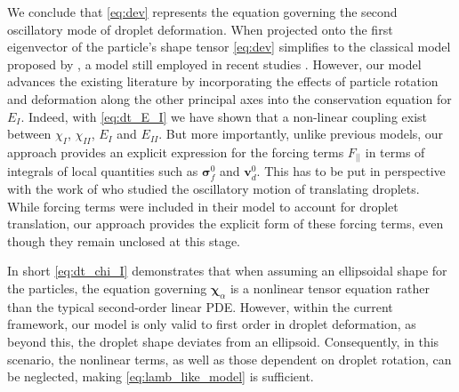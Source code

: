 We conclude that \ref{eq:dev} represents the equation governing the second oscillatory mode of droplet deformation. 
When projected onto the first eigenvector of the particle's shape tensor \ref{eq:dev} simplifies to the classical model proposed by \citet{lamb1924hydrodynamics}, a model still employed in recent studies \citep{riviere2021sub}. 
However, our model advances the existing literature by incorporating the effects of particle rotation and deformation along the other principal axes into the conservation equation for $E_I$. 
Indeed, with \ref{eq:dt_E_I} we have shown that a non-linear coupling exist between $\chi_I$, $\chi_{II}$, $E_I$ and $E_{II}$. 
But more importantly, unlike previous models, our approach provides an explicit expression for the forcing terms $F_{||}$ in terms of integrals of local quantities such as $\bm\sigma_f^0$ and $\textbf{v}_d^0$.
This has to be put in perspective with the work of \citet{lalanne2013effect} who studied the oscillatory motion of translating droplets. 
While forcing terms were included in their model to account for droplet translation, our approach provides the explicit form of these forcing terms, even though they remain unclosed at this stage.

In short \ref{eq:dt_chi_I} demonstrates that when assuming an ellipsoidal shape for the particles, the equation governing $\bm\chi_\alpha$ is a nonlinear tensor equation rather than the typical second-order linear PDE. 
However, within the current framework, our model is only valid to first order in droplet deformation, as beyond this, the droplet shape deviates from an ellipsoid. 
Consequently, in this scenario, the nonlinear terms, as well as those dependent on droplet rotation, can be neglected, making \ref{eq:lamb_like_model} is sufficient. 

